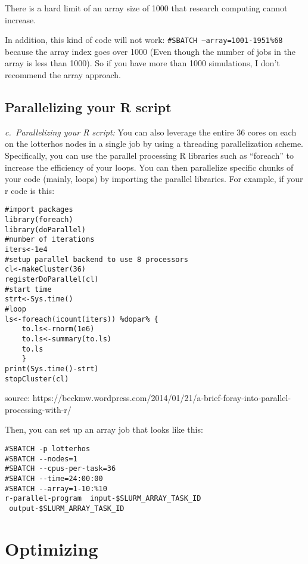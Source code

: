 \documentclass[
  letterpaper,
  DIV=11,
  numbers=noendperiod]{scrreprt}
\begin{document}
There is a hard limit of an array size of 1000 that research computing
cannot increase.

In addition, this kind of code will not work:
\texttt{\#SBATCH\ —array=1001-1951\%68} because the array index goes
over 1000 (Even though the number of jobs in the array is less than
1000). So if you have more than 1000 simulations, I don't recommend the
array approach.

\hypertarget{parallelizing-your-r-script}{%
\section*{\texorpdfstring{\textbf{Parallelizing your R
script}}{Parallelizing your R script}}\label{parallelizing-your-r-script}}


\emph{c.~Parallelizing your R script:} You can also leverage the entire
36 cores on each on the lotterhos nodes in a single job by using a
threading parallelization scheme. Specifically, you can use the parallel
processing R libraries such as ``foreach'' to increase the efficiency of
your loops. You can then parallelize specific chunks of your code
(mainly, loops) by importing the parallel libraries. For example, if
your r code is this:

\begin{verbatim}
#import packages
library(foreach)
library(doParallel)
#number of iterations
iters<-1e4
#setup parallel backend to use 8 processors
cl<-makeCluster(36)
registerDoParallel(cl)
#start time
strt<-Sys.time()
#loop
ls<-foreach(icount(iters)) %dopar% {
    to.ls<-rnorm(1e6)
    to.ls<-summary(to.ls)
    to.ls
    }
print(Sys.time()-strt)
stopCluster(cl)
\end{verbatim}

source:
https://beckmw.wordpress.com/2014/01/21/a-brief-foray-into-parallel-processing-with-r/

Then, you can set up an array job that looks like this:

\begin{verbatim}
#SBATCH -p lotterhos
#SBATCH --nodes=1
#SBATCH --cpus-per-task=36
#SBATCH --time=24:00:00
#SBATCH --array=1-10:%10
r-parallel-program  input-$SLURM_ARRAY_TASK_ID  output-$SLURM_ARRAY_TASK_ID
\end{verbatim}

\hypertarget{optimizing}{%
\chapter{Optimizing}\label{optimizing}}
\end{document}
